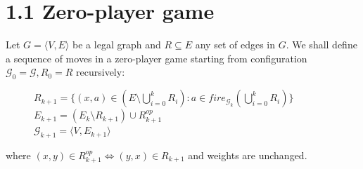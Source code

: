 \section*{1.1 Zero-player game}
Let $G = \langle V, E \rangle$ be a legal graph and $R \subseteq E$ any set of
edges in $G$. We shall define a sequence of moves in a zero-player game
starting from configuration $\mathcal{G}_0 = \mathcal{G},
R_0 = R$ recursively:
\begin{figure}[H]
      \centering
      $R_{k+1} = \{(x,a) \in (E \setminus \bigcup_{i=0}^k R_i):
      a \in fire_{\mathcal{G}_k}(\bigcup_{i=0}^k R_i)\}$\\
      $E_{k+1} = (E_k \setminus R_{k+1}) \cup R_{k+1}^{op}$\\
      $\mathcal{G}_{k+1} = \langle V, E_{k+1} \rangle$
\end{figure}
where $(x, y) \in R_{k+1}^{op} \Leftrightarrow (y, x) \in R_{k+1}$ and weights
are unchanged.


